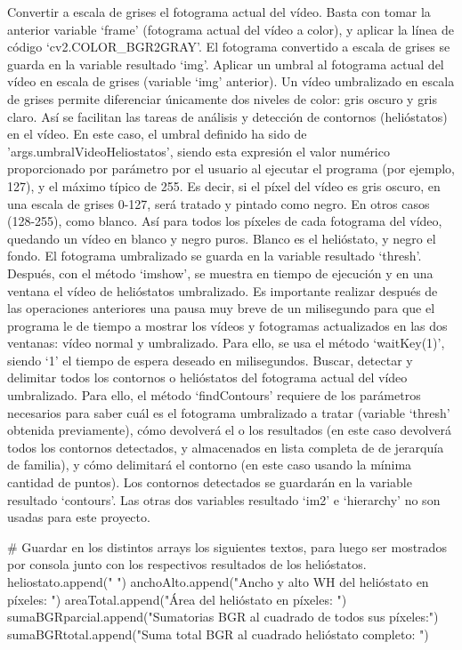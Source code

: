 Convertir a escala de grises el fotograma actual del vídeo. Basta con tomar la anterior variable ‘frame’ (fotograma actual del vídeo a color), y aplicar la línea de código ‘cv2.COLOR\_BGR2GRAY’. El fotograma convertido a escala de grises se guarda en la variable resultado ‘img’.
Aplicar un umbral al fotograma actual del vídeo en escala de grises (variable ‘img’ anterior). Un vídeo umbralizado en escala de grises permite diferenciar únicamente dos niveles de color: gris oscuro y gris claro. Así se facilitan las tareas de análisis y detección de contornos (helióstatos) en el vídeo. En este caso, el umbral definido ha sido de 'args.umbralVideoHeliostatos', siendo esta expresión el valor numérico proporcionado por parámetro por el usuario al ejecutar el programa (por ejemplo, 127), y el máximo típico de 255. Es decir, si el píxel del vídeo es gris oscuro, en una escala de grises 0-127, será tratado y pintado como negro. En otros casos (128-255), como blanco. Así para todos los píxeles de cada fotograma del vídeo, quedando un vídeo en blanco y negro puros. Blanco es el helióstato, y negro el fondo. El fotograma umbralizado se guarda en la variable resultado ‘thresh’. Después, con el método ‘imshow’, se muestra en tiempo de ejecución y en una ventana el vídeo de helióstatos umbralizado. Es importante realizar después de las operaciones anteriores una pausa muy breve de un milisegundo para que el programa le de tiempo a mostrar los vídeos y fotogramas actualizados en las dos ventanas: vídeo normal y umbralizado. Para ello, se usa el método ‘waitKey(1)’, siendo ‘1’ el tiempo de espera deseado en milisegundos.
Buscar, detectar y delimitar todos los contornos o helióstatos del fotograma actual del vídeo umbralizado. Para ello, el método ‘findContours’ requiere de los parámetros necesarios para saber cuál es el fotograma umbralizado a tratar (variable ‘thresh’ obtenida previamente), cómo devolverá el o los resultados (en este caso devolverá todos los contornos detectados, y almacenados en lista completa de de jerarquía de familia), y cómo delimitará el contorno (en este caso usando la mínima cantidad de puntos). Los contornos detectados se guardarán en la variable resultado ‘contours’. Las otras dos variables resultado ‘im2’ e ‘hierarchy’ no son usadas para este proyecto.


	\# Guardar en los distintos arrays los siguientes textos, para luego ser mostrados por consola junto con los respectivos resultados de los helióstatos.
    heliostato.append("                                               ")
    anchoAlto.append("Ancho y alto WH del helióstato en píxeles:      ")
    areaTotal.append("Área del helióstato en píxeles:                 ")
    sumaBGRparcial.append("Sumatorias BGR al cuadrado de todos sus píxeles:")
    sumaBGRtotal.append("Suma total BGR al cuadrado helióstato completo: ")
    
